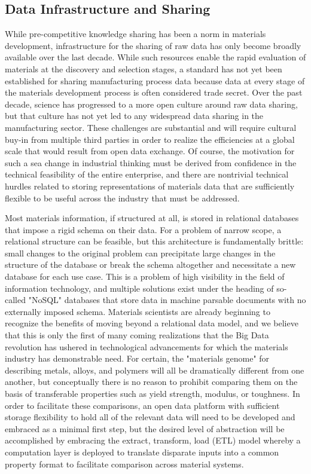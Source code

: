 \subsection{Data Infrastructure and Sharing}
While pre-competitive knowledge sharing has been a norm in materials development, infrastructure for the sharing of raw data has only become broadly available over the last decade\cite{CitrineInformatics,MP}. 
While such resources enable the rapid evaluation of materials at the discovery and selection stages, a standard has not yet been established for sharing manufacturing process data because data at every stage of the materials development process is often considered trade secret\cite{TheMinerals2013}. 
Over the past decade, science has progressed to a more open culture around raw data sharing, but that culture has not yet led to any widespread data sharing in the manufacturing sector.
These challenges are substantial and will require cultural buy-in from multiple third parties in order to realize the efficiencies at a global scale that would result from open data exchange. 
Of course, the motivation for such a sea change in industrial thinking must be derived from confidence in the technical feasibility of the entire enterprise, and there are nontrivial technical hurdles related to storing representations of materials data that are sufficiently flexible to be useful across the industry that must be addressed. 

Most materials information, if structured at all, is stored in relational databases that impose a rigid schema on their data. 
For a problem of narrow scope, a relational structure can be feasible, but this architecture is fundamentally brittle: small changes to the original problem can precipitate large changes in the structure of the database or break the schema altogether and necessitate a new database for each use case.
This is a problem of high visibility in the field of information technology, and multiple solutions exist under the heading of so-called "NoSQL" databases that store data in machine parsable documents with no externally imposed schema\cite{Han2011,Kaur2013}. Materials scientists are already beginning to recognize the benefits of moving beyond a relational data model\cite{Blair2014}, and we believe that this is only the first of many coming realizations that the Big Data revolution has ushered in technological advancements for which the materials industry has demonstrable need.
For certain, the "materials genome" for describing metals, alloys, and polymers will all be dramatically different from one another, but conceptually there is no reason to prohibit comparing them on the basis of transferable properties such as yield strength, modulus, or toughness. 
In order to facilitate these comparisons, an open data platform with sufficient storage flexibility to hold all of the relevant data will need to be developed and embraced as a minimal first step, but the desired level of abstraction will be accomplished by embracing the extract, transform, load (ETL) model whereby a computation layer is deployed to translate disparate inputs into a common property format to facilitate comparison across material systems.

